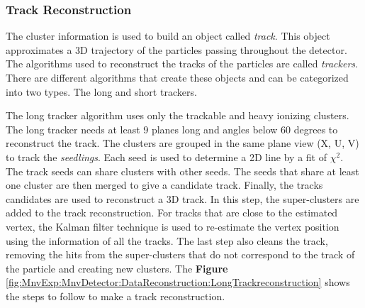 \subsubsection{Track Reconstruction}
\label{Cap:MnvExp:MnvDetector:DataReconstruction:TrackReconstruction}

The cluster information is used to build an object called \textit{track}. This object approximates a 3D trajectory of the particles passing throughout the detector. The algorithms used to reconstruct the tracks of the particles are called \textit{trackers}. There are different algorithms that create these objects and can be categorized into two types. The long and short trackers. 

The long tracker algorithm uses only the trackable and heavy ionizing clusters. The long tracker needs at least 9 planes long and angles below 60 degrees to reconstruct the track. The clusters are grouped in the same plane view (X, U, V) to track the \textit{ seedlings}. Each seed is used to determine a 2D line by a fit of $\chi^2$. The track seeds can share clusters with other seeds. The seeds that share at least one cluster are then merged to give a candidate track. Finally, the tracks candidates are used to reconstruct a 3D track. In this step, the super-clusters are added to the track reconstruction. For tracks that are close to the estimated vertex, the Kalman filter technique \cite{KalmanFilter} is used to re-estimate the vertex position using the information of all the tracks. The last step also cleans the track, removing the hits from the super-clusters that do not correspond to the track of the particle and creating new clusters. The \textbf{Figure} \ref{fig:MnvExp:MnvDetector:DataReconstruction:LongTrackreconstruction} shows the steps to follow to make a track reconstruction. 

